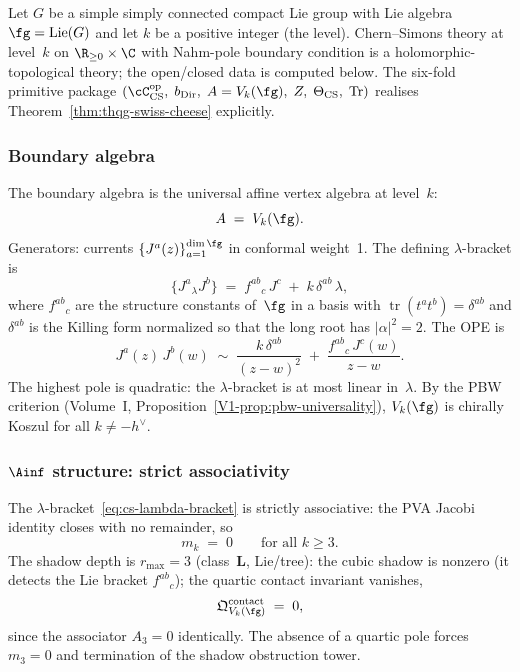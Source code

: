 Let $G$ be a simple simply connected compact Lie group with Lie algebra $\fg = \operatorname{Lie}(G)$ and let $k$ be a positive integer (the level). Chern--Simons theory at level~$k$ on $\R_{\ge 0} \times \C$ with Nahm-pole boundary condition is a holomorphic-topological theory; the open/closed data is computed below. The six-fold primitive package $(\cC_{\mathrm{CS}}^{\mathrm{op}},\; b_{\mathrm{Dir}},\; A = V_k(\fg),\; Z,\; \Theta_{\mathrm{CS}},\; \operatorname{Tr})$ realises Theorem~\ref{thm:thqg-swiss-cheese} explicitly.

\subsubsection*{Boundary algebra}

The boundary algebra is the universal affine vertex algebra at
level~$k$:
\begin{equation}\label{eq:cs-boundary-algebra}
A \;=\; V_k(\fg).
\end{equation}
Generators: currents $\{J^a(z)\}_{a=1}^{\dim\fg}$ in conformal
weight~1.
The defining $\lambda$-bracket is
\begin{equation}\label{eq:cs-lambda-bracket}
\{J^a{}_\lambda J^b\}
\;=\;
f^{ab}{}_c\, J^c \;+\; k\,\delta^{ab}\,\lambda,
\end{equation}
where $f^{ab}{}_c$ are the structure constants of~$\fg$ in a basis
with $\operatorname{tr}(t^a t^b) = \delta^{ab}$ and $\delta^{ab}$
is the Killing form normalized so that the long root has
$|\alpha|^2 = 2$.
The OPE is
\[
J^a(z)\, J^b(w)
\;\sim\;
\frac{k\,\delta^{ab}}{(z-w)^2}
\;+\;
\frac{f^{ab}{}_c\, J^c(w)}{z-w}.
\]
The highest pole is quadratic:
the $\lambda$-bracket is at most linear in~$\lambda$.
By the PBW criterion (Volume~I, Proposition~\ref*{V1-prop:pbw-universality}),
$V_k(\fg)$ is chirally Koszul for all $k \ne -h^\vee$.

\subsubsection*{$\Ainf$ structure: strict associativity}

The $\lambda$-bracket~\eqref{eq:cs-lambda-bracket} is strictly associative: the PVA Jacobi identity closes with no remainder, so
\begin{equation}\label{eq:cs-mk-vanish}
m_k \;=\; 0
\qquad
\text{for all } k \ge 3.
\end{equation}
The shadow depth is $r_{\max} = 3$ (class~$\mathbf{L}$, Lie/tree): the cubic shadow is nonzero (it detects the Lie bracket $f^{ab}{}_c$); the quartic contact invariant vanishes,
\begin{equation}\label{eq:cs-quartic-vanishes}
\mathfrak{Q}^{\mathrm{contact}}_{V_k(\fg)} \;=\; 0,
\end{equation}
since the associator $A_3 = 0$ identically. The absence of a quartic pole forces $m_3 = 0$ and termination of the shadow obstruction tower.

